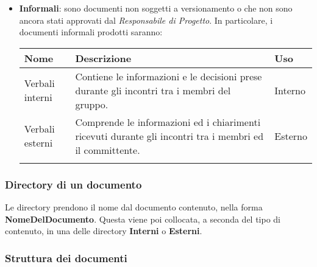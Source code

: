 \begin{itemize}
\item \textbf{Informali}: sono documenti non soggetti a versionamento o che non sono ancora stati approvati dal \textit{Responsabile di Progetto}. \newline 
In particolare, i documenti informali prodotti saranno:
{
	\setlength{\freewidth}{\dimexpr\textwidth-1\tabcolsep}
	\renewcommand{\arraystretch}{1.5}
	\setlength{\aboverulesep}{0pt}
	\setlength{\belowrulesep}{0pt}
	\begin{longtable}{L{.210\freewidth} L{.6\freewidth} L{.080\freewidth}}
		\toprule 
		\textbf{Nome} & \textbf{Descrizione} & \textbf{Uso}\\
		\toprule
		\endhead		
		Verbali interni & Contiene le informazioni e le decisioni prese durante gli incontri tra i membri del gruppo. & Interno \\ 
		Verbali esterni & Comprende le informazioni ed i chiarimenti ricevuti durante gli incontri tra i membri ed il committente. & Esterno \\
		\bottomrule
		\hiderowcolors
	\end{longtable}
}
\end{itemize}
\subsubsection{Directory di un documento}
Le directory prendono il nome dal documento contenuto, nella forma \textbf{NomeDelDocumento}.  Questa viene poi collocata,  a seconda del tipo di contenuto,  in una delle directory \textbf{Interni} o \textbf{Esterni}. 
\subsubsection{Struttura dei documenti}
